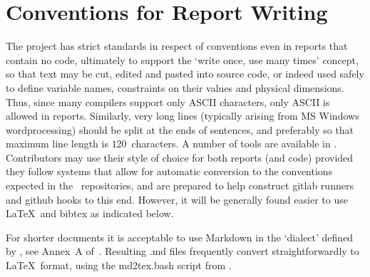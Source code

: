 \section{Conventions for Report Writing}\label{sec:conv}
The project has strict standards in respect of conventions even in reports
that contain no code, ultimately to support the `write once, use many times' concept,
so that text may be cut, edited and pasted into source code, or indeed used safely to define
variable names, constraints on their values and physical dimensions.
Thus, since many compilers support only ASCII characters, only ASCII is allowed
in reports. Similarly, very long lines (typically arising from MS Windows wordprocessing)
should be split at the ends of sentences, and preferably so that maximum line length
is $120$~characters. A number of tools are available in .
Contributors may use their style of choice for both reports (and code) provided
they follow systems that allow for automatic conversion to the conventions
expected in the \nep \ repositories, and are prepared to help construct gitlab runners and
github hooks to this end. However, it will be generally found easier to use \LaTeX \ and
bibtex as indicated below.

For shorter documents it is acceptable to use Markdown in the `dialect' defined by
, see Annex~A of~\cite{y3re314}. Resulting .md files frequently convert
straightforwardly to \LaTeX \ format, using the md2tex.bash script from .


